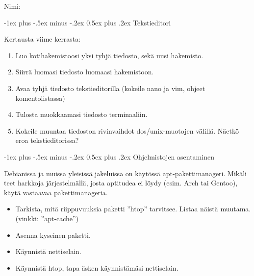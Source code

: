 \documentclass[12pt,portrait,a4]{article}
\makeatletter
\renewcommand{\section}{\@startsection{section}{1}{0mm}%
                                {-1ex plus -.5ex minus -.2ex}%
                                {0.5ex plus .2ex}%
                                {\normalfont\large\bfseries}}
\makeatother
\begin{document}
\raggedbottom

\begin{multicols}{2}
\setlength{\premulticols}{1pt}
\setlength{\postmulticols}{1pt}
\setlength{\multicolsep}{1pt}
\setlength{\columnsep}{2pt}

Nimi:\hrulefill


\end{multicols}

\section{Tekstieditori}

Kertausta viime kerrasta:
\begin{enumerate}
\item Luo kotihakemistoosi yksi tyhjä tiedosto, sekä uusi hakemisto.
\item Siirrä luomasi tiedosto luomaasi hakemistoon.
\item Avaa tyhjä tiedosto tekstieditorilla (kokeile nano ja vim, ohjeet
komentolistassa)
\item Tulosta muokkaamasi tiedosto terminaaliin.
\item Kokeile muuntaa tiedoston rivinvaihdot dos/unix-muotojen välillä.
Näetkö eroa tekstieditorissa?
\end{enumerate}



\section{Ohjelmistojen asentaminen}

Debianissa ja muissa yleisissä jakeluissa on käytössä apt-pakettimanageri. Mikäli teet harkkoja järjestelmällä, josta aptitudea ei löydy (esim. Arch tai Gentoo), käytä vastaavaa pakettimanageria.
\begin{itemize}
    \item Tarkista, mitä riippuvuuksia paketti ''htop'' tarvitsee. Listaa näistä muutama. (vinkki: ''apt-cache'')
\item Asenna kyseinen paketti.
\item Käynnistä nettiselain.
\item Käynnistä htop, tapa äsken käynnistämäsi nettiselain.
\end{itemize}
\end{document}
